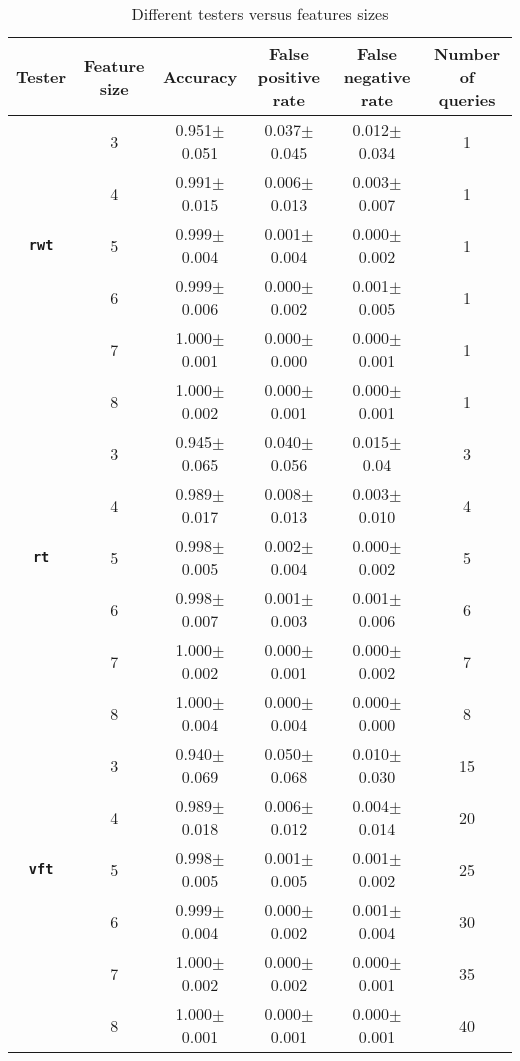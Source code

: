 \begin{table}[h]
    \caption{Different testers versus features sizes}

  \label{tab:diff_featureSize}
  \centering
  \begin{tabular}{cccccc}
  \\
    \toprule
    \textbf{Tester}     & \textbf{Feature size}     & \textbf{Accuracy} & \textbf{False positive rate} & \textbf{False negative rate} & \textbf{Number of queries} \\
    \midrule
     & 3 & 0.951$\pm$	0.051&	0.037$\pm$	0.045&	0.012$\pm$	0.034&	1\\
     & 4 & 0.991$\pm$	0.015&	0.006$\pm$	0.013&	0.003$\pm$	0.007&	1\\
     \textbf{\texttt{rwt}}& 5 & 0.999$\pm$	0.004&	0.001$\pm$	0.004&	0.000$\pm$	0.002&	1\\
     & 6 & 0.999$\pm$	0.006&	0.000$\pm$	0.002&	0.001$\pm$	0.005&	1\\
     & 7 & 1.000$\pm$	0.001&	0.000$\pm$	0.000&	0.000$\pm$	0.001&	1\\
     & 8 & 1.000$\pm$	0.002&	0.000$\pm$	0.001&	0.000$\pm$	0.001&	1\\
     \midrule
     & 3 & 0.945$\pm$	0.065&	0.040$\pm$	0.056&	0.015$\pm$	0.04&	3\\
     & 4 & 0.989$\pm$	0.017&	0.008$\pm$	0.013&	0.003$\pm$	0.010&	4\\
     \textbf{\texttt{rt}}& 5 & 0.998$\pm$	0.005&	0.002$\pm$	0.004&	0.000$\pm$	0.002&	5\\
     & 6 & 0.998$\pm$	0.007&	0.001$\pm$	0.003&	0.001$\pm$	0.006&	6\\
     & 7 & 1.000$\pm$	0.002&	0.000$\pm$	0.001&	0.000$\pm$	0.002&	7\\
     & 8 & 1.000$\pm$	0.004&	0.000$\pm$	0.004&	0.000$\pm$	0.000&	8\\
     \midrule
     & 3 & 0.940$\pm$	0.069&	0.050$\pm$	0.068&	0.010$\pm$	0.030&	15\\
     & 4 & 0.989$\pm$	0.018&	0.006$\pm$	0.012&	0.004$\pm$	0.014&	20\\
     \textbf{\texttt{vft}}& 5 & 0.998$\pm$	0.005&	0.001$\pm$	0.005&	0.001$\pm$	0.002&	25\\
     & 6 & 0.999$\pm$	0.004&	0.000$\pm$	0.002&	0.001$\pm$	0.004&	30\\
     & 7 & 1.000$\pm$	0.002&	0.000$\pm$	0.002&	0.000$\pm$	0.001&	35\\
     & 8 & 1.000$\pm$	0.001&	0.000$\pm$	0.001&	0.000$\pm$	0.001&	40\\
     \midrule

\end{tabular}
\end{table}
